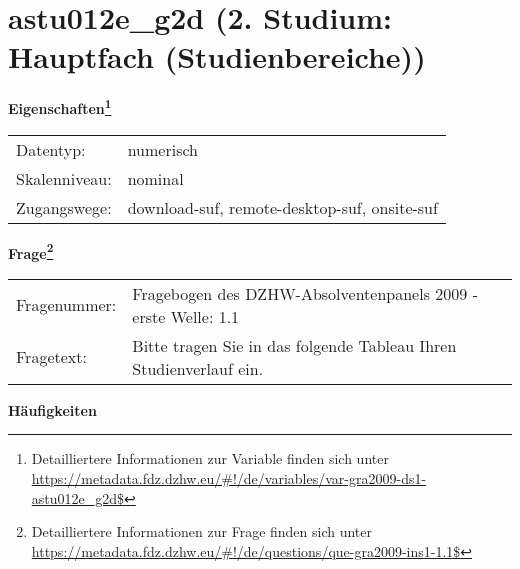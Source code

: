 
    \setcounter{footnote}{0}

    \vspace*{-1.8cm}
	\section{astu012e\_g2d (2. Studium: Hauptfach (Studienbereiche))}
	\label{section:astu012e_g2d}



    \vspace*{0.5cm}
    \noindent\textbf{Eigenschaften\footnote{Detailliertere Informationen zur Variable finden sich unter
		\url{https://metadata.fdz.dzhw.eu/\#!/de/variables/var-gra2009-ds1-astu012e_g2d$}}}\\
	\begin{tabularx}{\hsize}{@{}lX}
	Datentyp: & numerisch \\
	Skalenniveau: & nominal \\
	Zugangswege: &
	  download-suf, 
	  remote-desktop-suf, 
	  onsite-suf
 \\
    \end{tabularx}



				\vspace*{0.5cm}
                \noindent\textbf{Frage\footnote{Detailliertere Informationen zur Frage finden sich unter
		              \url{https://metadata.fdz.dzhw.eu/\#!/de/questions/que-gra2009-ins1-1.1$}}}\\
				\begin{tabularx}{\hsize}{@{}lX}
					Fragenummer: &
					  Fragebogen des DZHW-Absolventenpanels 2009 - erste Welle:
					  1.1
 \\
					Fragetext: & Bitte tragen Sie in das folgende Tableau Ihren Studienverlauf ein. \\
				\end{tabularx}





        		\vspace*{0.5cm}
                \noindent\textbf{Häufigkeiten}

